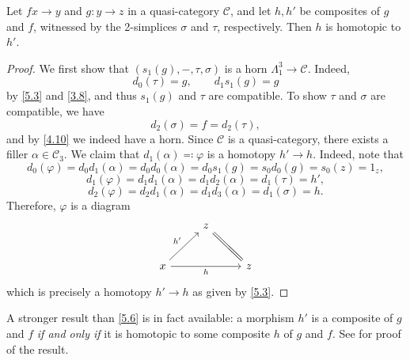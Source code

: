 \begin{proposition}\label{5.6}
	Let $f x \to y$ and $g : y \to z$ in a quasi-category $\mathcal{C} $, and let $h,h'$ be composites of $g$ and $f$, witnessed by the 2-simplices $\sigma $ and $\tau $, respectively. Then $h$ is homotopic to $h'$.
\end{proposition}
\begin{proof}
	We first show that $(s_1(g),-,\tau ,\sigma )$ is a horn $\Lambda _1^3\to \mathcal{C} $. Indeed,
	\[
		d_0(\tau )=g,\qquad d_1s_1(g)=g
	\]
	by \cref{5.3} and \cref{3.8}, and thus $s_1(g)$ and $\tau $ are compatible. To show $\tau $ and $\sigma $ are compatible, we have
	\[
		d_2(\sigma )=f=d_2(\tau ),
	\]
	and by \cref{4.10} we indeed have a horn. Since $\mathcal{C} $ is a quasi-category, there exists a filler $\alpha \in \mathcal{C} _3$. We claim that $d_1(\alpha )\eqqcolon \varphi $ is a homotopy $h' \to h$. Indeed, note that
	\[
		d_0(\varphi )=d_0d_1(\alpha )=d_0d_0(\alpha )=d_0s_1(g)=s_0d_0(g)=s_0(z)=1_z,
	\]
	\[
		d_1(\varphi )=d_1d_1(\alpha )=d_1d_2(\alpha )=d_1(\tau )=h',
	\]
	\[
		d_2(\varphi )=d_2d_1(\alpha )=d_1d_3(\alpha )=d_1(\sigma )=h
	.\]
	Therefore, $\varphi $ is a diagram
	\[\begin{tikzcd}[row sep = 2.5em, column sep = 2.5em]
	 & z \ar[equals, dr]  &  \\
	x \ar[" h' ", ur] \ar[" h "', rr]  &  & z
	\end{tikzcd}\]
	which is precisely a homotopy $h'\to h$ as given by \cref{5.3}.
\end{proof}

A stronger result than \cref{5.6} is in fact available: a morphism $h'$ is a composite of $g$ and $f$ \emph{if and only if} it is homotopic to some composite $h$ of $g$ and $f$. See \cite[0041]{kerodon} for proof of the result.

